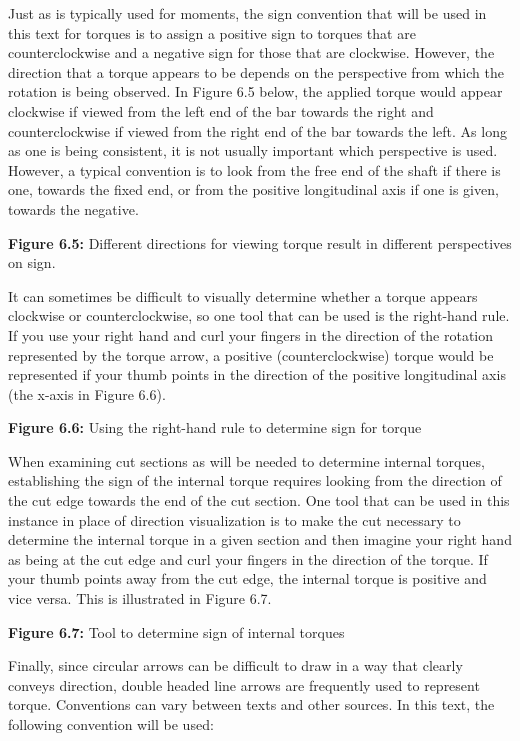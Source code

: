 \documentclass[
  letterpaper,
  DIV=11,
  numbers=noendperiod]{scrreprt}
\theoremstyle{definition}
\theoremstyle{remark}
\begin{document}
Just as is typically used for moments, the sign convention that will be
used in this text for torques is to assign a positive sign to torques
that are counterclockwise and a negative sign for those that are
clockwise. However, the direction that a torque appears to be depends on
the perspective from which the rotation is being observed. In Figure 6.5
below, the applied torque would appear clockwise if viewed from the left
end of the bar towards the right and counterclockwise if viewed from the
right end of the bar towards the left. As long as one is being
consistent, it is not usually important which perspective is used.
However, a typical convention is to look from the free end of the shaft
if there is one, towards the fixed end, or from the positive
longitudinal axis if one is given, towards the negative.

\textbf{Figure 6.5:} Different directions for viewing torque result in
different perspectives on sign.

It can sometimes be difficult to visually determine whether a torque
appears clockwise or counterclockwise, so one tool that can be used is
the right-hand rule. If you use your right hand and curl your fingers in
the direction of the rotation represented by the torque arrow, a
positive (counterclockwise) torque would be represented if your thumb
points in the direction of the positive longitudinal axis (the x-axis in
Figure 6.6).

\textbf{Figure 6.6:} Using the right-hand rule to determine sign for
torque

When examining cut sections as will be needed to determine internal
torques, establishing the sign of the internal torque requires looking
from the direction of the cut edge towards the end of the cut section.
One tool that can be used in this instance in place of direction
visualization is to make the cut necessary to determine the internal
torque in a given section and then imagine your right hand as being at
the cut edge and curl your fingers in the direction of the torque. If
your thumb points away from the cut edge, the internal torque is
positive and vice versa. This is illustrated in Figure 6.7.

\textbf{Figure 6.7:} Tool to determine sign of internal torques

Finally, since circular arrows can be difficult to draw in a way that
clearly conveys direction, double headed line arrows are frequently used
to represent torque. Conventions can vary between texts and other
sources. In this text, the following convention will be used:
\end{document}
